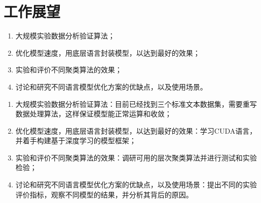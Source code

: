 \section{工作展望}
\begin{enumerate}
\item 大规模实验数据分析验证算法；
\item 优化模型速度，用底层语言封装模型，以达到最好的效果；
\item 实验和评价不同聚类算法的效果；
\item 讨论和研究不同语言模型优化方案的优缺点，以及使用场景。
\end{enumerate}
\begin{enumerate}
\item 大规模实验数据分析验证算法：目前已经找到三个标准文本数据集，需要重写数据处理算法，这样保证模型能正常运算和收敛；
\item 优化模型速度，用底层语言封装模型，以达到最好的效果：学习CUDA语言，并着手构建基于深度学习的模型框架；
\item 实验和评价不同聚类算法的效果：调研可用的层次聚类算法并进行测试和实验检验；
\item 讨论和研究不同语言模型优化方案的优缺点，以及使用场景：提出不同的实验评价指标，观察不同模型的结果，并分析其背后的原因。
\end{enumerate}